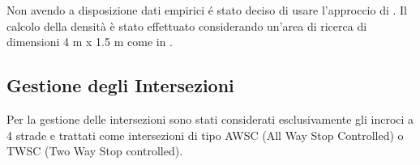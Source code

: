 




Non avendo a disposizione dati empirici é stato deciso di usare l'approccio di \textcite{wang2021novel}.
%
Il calcolo della densità è stato effettuato considerando un'area di ricerca di dimensioni 4 m x 1.5 m 
come in \textcite{goto2012tsunami, wang2021novel}.



\newpage

\subsection{Gestione degli Intersezioni}
Per la gestione delle intersezioni sono stati considerati esclusivamente gli incroci a 4 strade e trattati come intersezioni di tipo AWSC (All Way Stop Controlled) o TWSC (Two Way Stop controlled).

